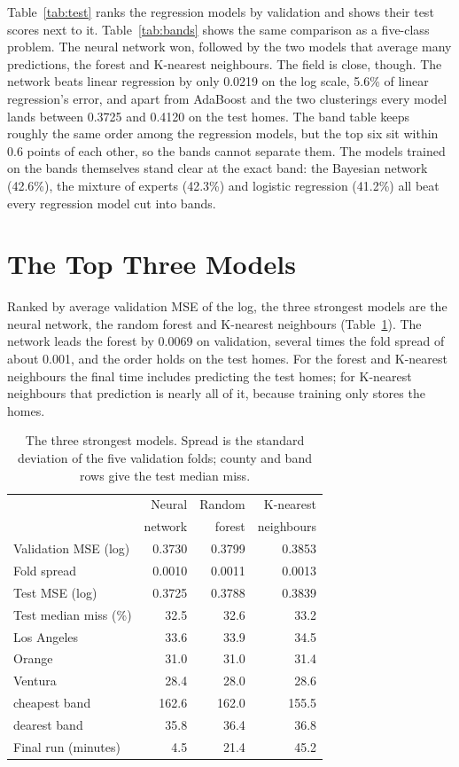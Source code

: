 \documentclass[sigconf,nonacm,10pt]{acmart}
\begin{document}
Table~\ref{tab:test} ranks the regression models by validation and shows their test scores next to it. Table~\ref{tab:bands} shows the same comparison as a five-class problem. The neural network won, followed by the two models that average many predictions, the forest and K-nearest neighbours. The field is close, though. The network beats linear regression by only 0.0219 on the log scale, 5.6\% of linear regression's error, and apart from AdaBoost and the two clusterings every model lands between 0.3725 and 0.4120 on the test homes. The band table keeps roughly the same order among the regression models, but the top six sit within 0.6 points of each other, so the bands cannot separate them. The models trained on the bands themselves stand clear at the exact band: the Bayesian network (42.6\%), the mixture of experts (42.3\%) and logistic regression (41.2\%) all beat every regression model cut into bands.

\section{The Top Three Models}
\label{sec:top}

Ranked by average validation MSE of the log, the three strongest models are the neural network, the random forest and K-nearest neighbours (Table~\ref{tab:top}). The network leads the forest by 0.0069 on validation, several times the fold spread of about 0.001, and the order holds on the test homes. For the forest and K-nearest neighbours the final time includes predicting the test homes; for K-nearest neighbours that prediction is nearly all of it, because training only stores the homes.

\begin{table}[t]
\caption{The three strongest models. Spread is the standard deviation of the five validation folds; county and band rows give the test median miss.}
\label{tab:top}
\small
\setlength{\tabcolsep}{4pt}
\begin{tabular}{@{}lrrr@{}}
\toprule
 & Neural & Random & K-nearest \\
 & network & forest & neighbours \\
\midrule
Validation MSE (log) & 0.3730 & 0.3799 & 0.3853 \\
Fold spread & 0.0010 & 0.0011 & 0.0013 \\
Test MSE (log) & 0.3725 & 0.3788 & 0.3839 \\
Test median miss (\%) & 32.5 & 32.6 & 33.2 \\
\quad Los Angeles & 33.6 & 33.9 & 34.5 \\
\quad Orange & 31.0 & 31.0 & 31.4 \\
\quad Ventura & 28.4 & 28.0 & 28.6 \\
\quad cheapest band & 162.6 & 162.0 & 155.5 \\
\quad dearest band & 35.8 & 36.4 & 36.8 \\
Final run (minutes) & 4.5 & 21.4 & 45.2 \\
\bottomrule
\end{tabular}
\end{table}
\end{document}
